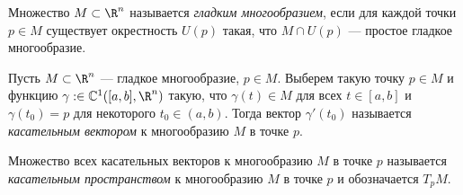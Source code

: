 


\begin{defn}
  Множество $M \subset \R^n$ называется \emph{гладким многообразием}, если для каждой точки $p \in M$ существует окрестность $U(p)$ такая, что $M \cap U(p)$ --- простое гладкое многообразие.
\end{defn}

\begin{defn}
  Пусть $M \subset \R^n$ --- гладкое многообразие, $p \in M$. Выберем такую точку $p \in M$ и функцию $\gamma : \in \mathbb{C}^1([a, b], \R^n)$ такую, что $\gamma(t) \in M$ для всех $t \in [a, b]$ и $\gamma(t_0) = p$ для некоторого $t_0 \in (a, b)$. Тогда вектор $\gamma'(t_0)$ называется \emph{касательным вектором} к многообразию $M$ в точке $p$.
\end{defn}
\begin{defn}
  Множество всех касательных векторов к многообразию $M$ в точке $p$ называется \emph{касательным пространством} к многообразию $M$ в точке $p$ и обозначается $T_p M$.
\end{defn}


